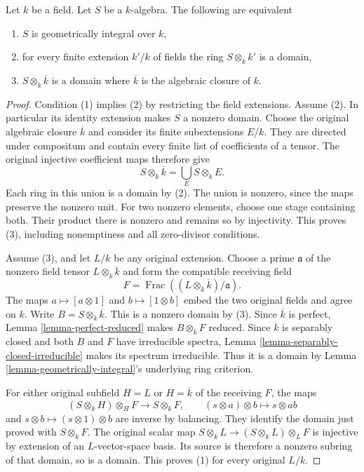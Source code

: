 \begin{lemma}
\label{lemma-characterize-geometrically-integral}
Let $k$ be a field. Let $S$ be a $k$-algebra.
The following are equivalent
\begin{enumerate}
\item $S$ is geometrically integral over $k$,
\item for every finite extension $k'/k$ of fields
the ring $S \otimes_k k'$ is a domain,
\item $S \otimes_k \overline{k}$ is a domain
where $\overline{k}$ is the algebraic closure of $k$.
\end{enumerate}
\end{lemma}

\begin{proof}
Condition (1) implies (2) by
restricting the field extensions.
Assume (2). In particular its
identity extension makes $S$
a nonzero domain. Choose the
original algebraic closure
$\overline k$ and consider its
finite subextensions $E/k$.
They are directed under compositum
and contain every finite list
of coefficients of a tensor.
The original injective coefficient
maps therefore give
$$
S\otimes_k\overline k=\bigcup_E S\otimes_k E.
$$
Each ring in this union is a
domain by (2). The union is
nonzero, since the maps preserve
the nonzero unit. For two
nonzero elements, choose one
stage containing both. Their
product there is nonzero and
remains so by injectivity.
This proves (3), including
nonemptiness and all zero-divisor
conditions.

Assume (3), and let $L/k$
be any original extension.
Choose a prime $\mathfrak a$
of the nonzero field tensor
$L\otimes_k\overline k$ and
form the compatible receiving
field
$$
F=\operatorname{Frac}((L\otimes_k\overline k)/\mathfrak a).
$$
The maps $a\mapsto[a\otimes1]$
and $b\mapsto[1\otimes b]$
embed the two original fields
and agree on $k$. Write
$B=S\otimes_k\overline k$.
This is a nonzero domain
by (3). Since $\overline k$
is perfect, Lemma
\ref{lemma-perfect-reduced}
makes $B\otimes_{\overline k}F$
reduced. Since $\overline k$
is separably closed and both
$B$ and $F$ have irreducible
spectra, Lemma
\ref{lemma-separably-closed-irreducible}
makes its spectrum irreducible.
Thus it is a domain by Lemma
\ref{lemma-geometrically-integral}'s
underlying ring criterion.

For either original subfield
$H=L$ or $H=\overline k$ of
the receiving $F$, the maps
$$
(S\otimes_k H)\otimes_H F\longrightarrow S\otimes_k F,
\qquad(s\otimes a)\otimes b\longmapsto s\otimes ab
$$
and $s\otimes b\mapsto(s\otimes1)\otimes b$
are inverse by balancing.
They identify the domain just
proved with $S\otimes_k F$.
The original scalar map
$S\otimes_k L\to(S\otimes_k L)\otimes_L F$
is injective by extension of
an $L$-vector-space basis.
Its source is therefore a
nonzero subring of that domain,
so is a domain. This proves
(1) for every original $L/k$.


\end{proof}
